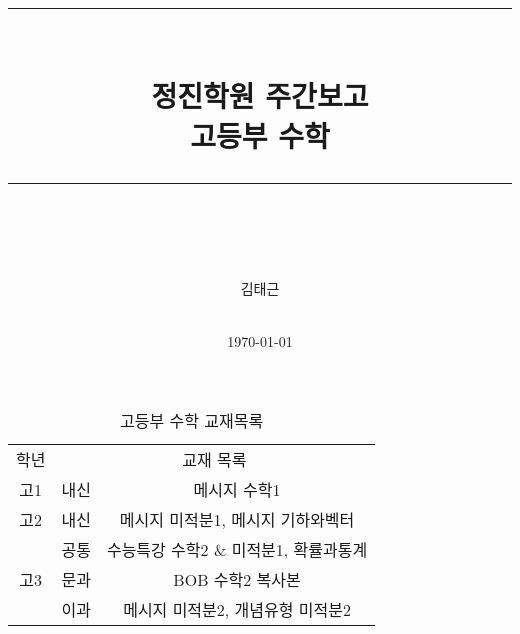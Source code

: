 \documentclass[idxtotoc,hyperref,openany]{labbook} %
\newcommand{\HRule}{\rule{\linewidth}{0.5mm}} %
\begin{document}

\frontmatter %
\title{
\begin{center}
\HRule \\[0.4cm]
{\Huge \bfseries 정진학원 주간보고  \\[0.5cm] \Large 고등부 수학}\\[0.4cm] %
\HRule \\[1.5cm]
\end{center}
}
\author{\LARGE 김태근 \\  \\[2cm]} %
\date{\today} %
\maketitle

\tableofcontents

\mainmatter %












\begin{table}[h]
\centering
\begin{adjustbox}{width=\textwidth}
\begin{tabular}{c||c|c}
\toprule
\midrule
학년 & \multicolumn{2}{c}{교재 목록} \\
\hhline{=||==}
고1 & 내신 & 메시지 수학1 \\
\hline
고2 & 내신 & 메시지 미적분1, 메시지 기하와벡터\\
\hline
\multirow{3}{*}{고3} & 공통 & 수능특강 수학2 \& 미적분1, 확률과통계 \\ \hhline{~--}
					& 문과 & BOB 수학2 복사본\\ \hhline{~--}
					& 이과 & 메시지 미적분2, 개념유형 미적분2\\

\hline
\end{tabular}
\end{adjustbox}
\caption{\label{tab:i} 고등부 수학 교재목록 }
\end{table}
\end{document}
